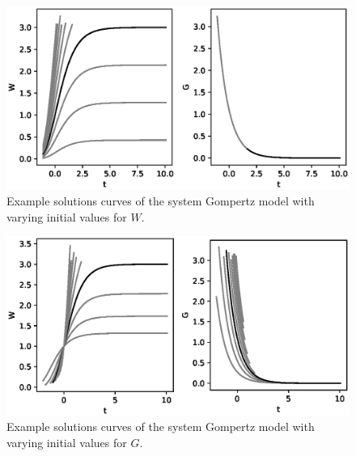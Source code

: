 \begin{figure}
  \centering
  \includegraphics[width=.64\textwidth]{images/gompertz-system-solutions-varw}
  \caption{Example solutions curves of the system Gompertz model with varying initial values for \(W\).}
  \label{fig:gompertz-system-solutions-varw}
\end{figure}
\begin{figure}
  \centering
  \includegraphics[width=.64\textwidth]{images/gompertz-system-solutions-varg}
  \caption{Example solutions curves of the system Gompertz model with varying initial values for \(G\).}
  \label{fig:gompertz-system-solutions-varg}
\end{figure}

